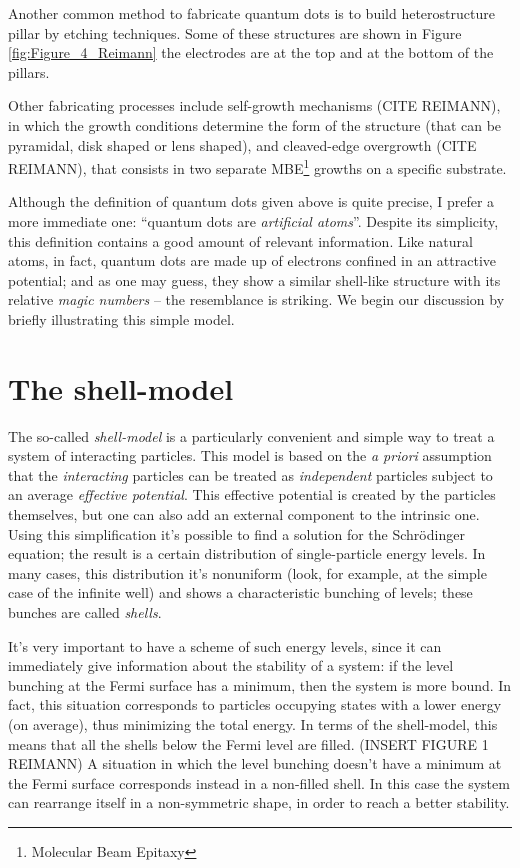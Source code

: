 \documentclass[a4paper,twoside,11pt]{book}
\begin{document}
Another common method to fabricate quantum dots is to build heterostructure pillar by etching techniques. Some of these structures are shown in Figure \ref{fig:Figure_4_Reimann} the electrodes are at the top and at the bottom of the pillars.

Other fabricating processes include self-growth mechanisms (CITE REIMANN), in which the growth conditions determine the form of the structure (that can be pyramidal, disk shaped or lens shaped), and cleaved-edge overgrowth (CITE REIMANN), that consists in two separate MBE\footnote{Molecular Beam Epitaxy} growths on a specific substrate.

Although the definition of quantum dots given above is quite precise, I prefer a more immediate one: ``quantum dots are \emph{artificial atoms}''. Despite its simplicity, this definition contains a good amount of relevant information. Like natural atoms, in fact, quantum dots are made up of electrons confined in an attractive potential; and as one may guess, they show a similar shell-like structure with its relative \emph{magic numbers} -- the resemblance is striking. We begin our discussion by briefly illustrating this simple model.

\section{The shell-model}
The so-called \emph{shell-model} is a particularly convenient and simple way to treat a system of interacting particles. This model is based on the \emph{a priori} assumption that the \emph{interacting} particles can be treated as \emph{independent} particles subject to an average \emph{effective potential}. This effective potential is created by the particles themselves, but one can also add an external component to the intrinsic one. Using this simplification it's possible to find a solution for the Schr\"{o}dinger equation; the result is a certain distribution of single-particle energy levels. In many cases, this distribution it's nonuniform (look, for example, at the simple case of the infinite well) and shows a characteristic bunching of levels; these bunches are called \emph{shells}.

It's very important to have a scheme of such energy levels, since it can immediately give information about the stability of a system: if the level bunching at the Fermi surface has a minimum, then the system is more bound. In fact, this situation corresponds to particles occupying states with a lower energy (on average), thus minimizing the total energy. In terms of the shell-model, this means that all the shells below the Fermi level are filled. (INSERT FIGURE 1 REIMANN) A situation in which the level bunching doesn't have a minimum at the Fermi surface corresponds instead in a non-filled shell. In this case the system can rearrange itself in a non-symmetric shape, in order to reach a better stability.
\end{document}

